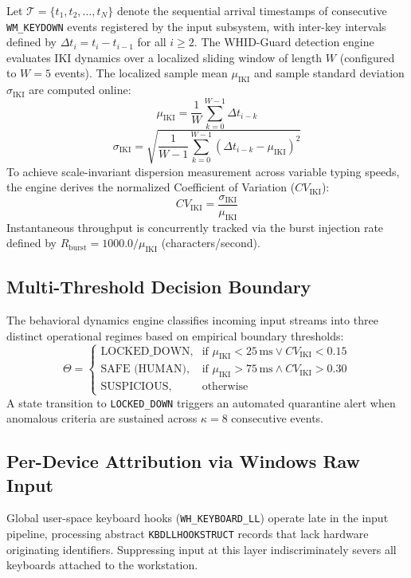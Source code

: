 \documentclass[conference]{IEEEtran}
\begin{document}
Let $\mathcal{T} = \{t_1, t_2, \dots, t_N\}$ denote the sequential arrival timestamps of consecutive \texttt{WM\_KEYDOWN} events registered by the input subsystem, with inter-key intervals defined by $\Delta t_i = t_i - t_{i-1}$ for all $i \ge 2$. The WHID-Guard detection engine evaluates IKI dynamics over a localized sliding window of length $W$ (configured to $W=5$ events). The localized sample mean $\mu_{\text{IKI}}$ and sample standard deviation $\sigma_{\text{IKI}}$ are computed online:
\begin{equation}
\mu_{\text{IKI}} = \frac{1}{W} \sum_{k=0}^{W-1} \Delta t_{i-k}
\label{eq:mean_iki}
\end{equation}
\begin{equation}
\sigma_{\text{IKI}} = \sqrt{\frac{1}{W-1} \sum_{k=0}^{W-1} (\Delta t_{i-k} - \mu_{\text{IKI}})^2}
\label{eq:std_iki}
\end{equation}
To achieve scale-invariant dispersion measurement across variable typing speeds, the engine derives the normalized Coefficient of Variation ($CV_{\text{IKI}}$):
\begin{equation}
CV_{\text{IKI}} = \frac{\sigma_{\text{IKI}}}{\mu_{\text{IKI}}}
\label{eq:cv_def}
\end{equation}
Instantaneous throughput is concurrently tracked via the burst injection rate defined by $R_{\text{burst}} = 1000.0 / \mu_{\text{IKI}}$ (characters/second).

\subsection{Multi-Threshold Decision Boundary}
The behavioral dynamics engine classifies incoming input streams into three distinct operational regimes based on empirical boundary thresholds:
\begin{equation}
\Theta = 
\begin{cases}
\text{LOCKED\_DOWN}, & \text{if } \mu_{\text{IKI}} < 25\,\text{ms} \lor CV_{\text{IKI}} < 0.15 \\
\text{SAFE (HUMAN)}, & \text{if } \mu_{\text{IKI}} > 75\,\text{ms} \land CV_{\text{IKI}} > 0.30 \\
\text{SUSPICIOUS}, & \text{otherwise}
\end{cases}
\label{eq:decision_boundary}
\end{equation}
A state transition to \texttt{LOCKED\_DOWN} triggers an automated quarantine alert when anomalous criteria are sustained across $\kappa = 8$ consecutive events.

\subsection{Per-Device Attribution via Windows Raw Input}
Global user-space keyboard hooks (\texttt{WH\_KEYBOARD\_LL}) operate late in the input pipeline, processing abstract \texttt{KBDLLHOOKSTRUCT} records that lack hardware originating identifiers. Suppressing input at this layer indiscriminately severs all keyboards attached to the workstation.
\end{document}
